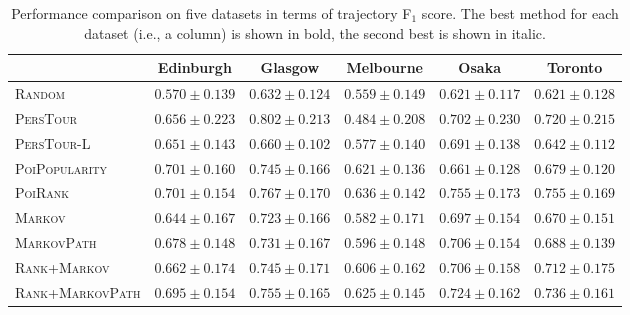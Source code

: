 \begin{table*}[t]
\caption{Performance comparison on five datasets in terms of trajectory F$_1$ score. 
        The best method for each dataset (i.e., a column) is shown in bold, the second best is shown in italic.}
\label{tab:f1}
\centering
\setlength{\tabcolsep}{10pt} %
\begin{tabular}{l|ccccc} \hline
 & Edinburgh & Glasgow & Melbourne & Osaka & Toronto \\ \hline
\textsc{Random} & $0.570\pm0.139$ & $0.632\pm0.124$ & $0.559\pm0.149$ & $0.621\pm0.117$ & $0.621\pm0.128$ \\
\textsc{PersTour}\cite{ijcai15} & $0.656\pm0.223$ & $\mathbf{0.802\pm0.213}$ & $0.484\pm0.208$ & $0.702\pm0.230$ & $0.720\pm0.215$ \\
\textsc{PersTour-L} & $0.651\pm0.143$ & $0.660\pm0.102$ & $0.577\pm0.140$ & $0.691\pm0.138$ & $0.642\pm0.112$ \\
\textsc{PoiPopularity} & $\mathit{0.701\pm0.160}$ & $0.745\pm0.166$ & $0.621\pm0.136$ & $0.661\pm0.128$ & $0.679\pm0.120$ \\
\textsc{PoiRank} & $\mathbf{0.701\pm0.154}$ & $\mathit{0.767\pm0.170}$ & $\mathbf{0.636\pm0.142}$ & $\mathbf{0.755\pm0.173}$ & $\mathbf{0.755\pm0.169}$ \\
\textsc{Markov} & $0.644\pm0.167$ & $0.723\pm0.166$ & $0.582\pm0.171$ & $0.697\pm0.154$ & $0.670\pm0.151$ \\
\textsc{MarkovPath} & $0.678\pm0.148$ & $0.731\pm0.167$ & $0.596\pm0.148$ & $0.706\pm0.154$ & $0.688\pm0.139$ \\
\textsc{Rank+Markov} & $0.662\pm0.174$ & $0.745\pm0.171$ & $0.606\pm0.162$ & $0.706\pm0.158$ & $0.712\pm0.175$ \\
\textsc{Rank+MarkovPath} & $0.695\pm0.154$ & $0.755\pm0.165$ & $\mathit{0.625\pm0.145}$ & $\mathit{0.724\pm0.162}$ & $\mathit{0.736\pm0.161}$ \\
\hline
\end{tabular}
\end{table*}

